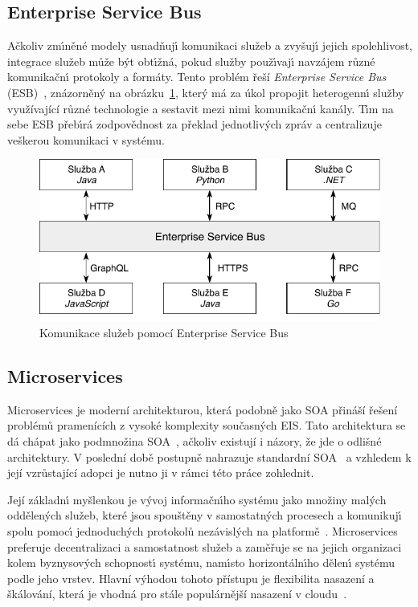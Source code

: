 \subsection{Enterprise Service Bus}

Ačkoliv zm\'{\i}něné modely usnadňuj\'{\i} komunikaci služeb a zvyšuj\'{\i} jejich
spolehlivost, integrace služeb může b\'yt obt\'{\i}žná, pokud služby použ\'{\i}vaj\'{\i}
navzájem různé komunikačn\'{\i} protokoly a formáty. Tento problém řeší \textit{Enterprise Service
Bus} (\gls{ESB})~\cite{chappell2004enterprise}, znázorněn\'y na obrázku~\ref{fig:enterprise-service-bus},
kter\'y má za úkol propojit heterogenn\'{\i} služby využívající různé technologie a sestavit mezi nimi
komunikačn\'{\i} kanály. T\'{\i}m na sebe \gls{ESB} přeb\'{\i}rá zodpovědnost za překlad jednotliv\'ych zpráv
a centralizuje veškerou komunikaci v systému.

\begin{figure}
    \centering
    \includegraphics[keepaspectratio=true, width=0.7\linewidth]{figures/enterprise-service-bus.pdf}
    \caption{Komunikace služeb pomocí Enterprise Service Bus}
    \label{fig:enterprise-service-bus}
\end{figure}

\subsection{Microservices}\label{sec:microservices}

Microservices je moderní architekturou, která podobně jako \gls{SOA} přináší řešení
problémů pramenících z vysoké komplexity současných \gls{EIS}. Tato architektura se dá
chápat jako podmnožina \gls{SOA}~\cite{cerny2017disambiguation, richards2015microservices},
ačkoliv existují i názory, že jde o odlišné architektury. V poslední době postupně nahrazuje standardní
\gls{SOA}~\cite{lewis2014microservices, xiao2016reflections} a vzhledem k její vzrůstající
adopci je nutno ji v rámci této práce zohlednit.

Její základn\'{\i} myšlenkou je v\'yvoj informačn\'{\i}ho systému jako množiny mal\'ych oddělen\'ych služeb,
které jsou spouštěny v samostatn\'ych procesech a komunikuj\'{\i} spolu pomoc\'{\i} jednoduch\'ych
protokolů nezávislých na platformě~\cite{lewis2014microservices}. Microservices preferuje decentralizaci a samostatnost služeb
a zaměřuje se na jejich organizaci kolem byznysov\'ych schopnost\'{\i} systému, nam\'{\i}sto horizontáln\'{\i}ho
dělen\'{\i} systému podle jeho vrstev. Hlavní výhodou tohoto přístupu je flexibilita nasazení a škálování, která je vhodná
pro stále populárnější nasazení v cloudu~\cite{cerny2018contextual, kratzke2017understanding, xiao2016reflections}.

